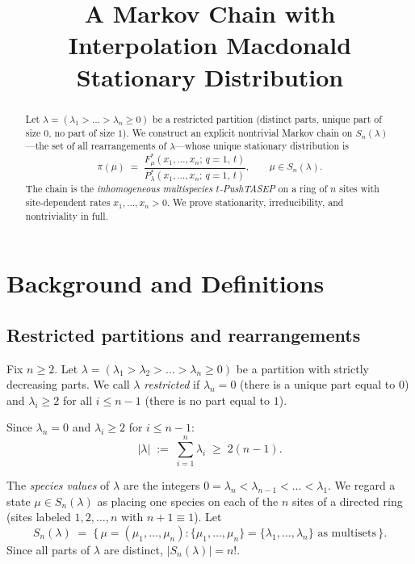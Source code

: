 \documentclass[12pt]{article}
\title{A Markov Chain with Interpolation Macdonald Stationary Distribution}
\author{}
\date{}
\theoremstyle{definition}
\begin{document}
\maketitle

\begin{abstract}
Let $\lambda = (\lambda_1 > \dots > \lambda_n \geq 0)$ be a restricted partition
(distinct parts, unique part of size $0$, no part of size $1$).  We construct
an explicit nontrivial Markov chain on $S_n(\lambda)$---the set of all
rearrangements of $\lambda$---whose unique stationary distribution is
\[
  \pi(\mu) \;=\; \frac{F^*_\mu(x_1,\dots,x_n;\,q{=}1,\,t)}{P^*_\lambda(x_1,\dots,x_n;\,q{=}1,\,t)},
  \qquad \mu \in S_n(\lambda).
\]
The chain is the \emph{inhomogeneous multispecies $t$-PushTASEP} on a ring of
$n$ sites with site-dependent rates $x_1,\dots,x_n > 0$.  We prove
stationarity, irreducibility, and nontriviality in full.
\end{abstract}

\section{Background and Definitions}

\subsection{Restricted partitions and rearrangements}

Fix $n \geq 2$.  Let $\lambda = (\lambda_1 > \lambda_2 > \dots > \lambda_n \geq 0)$
be a partition with strictly decreasing parts.  We call $\lambda$
\emph{restricted} if $\lambda_n = 0$ (there is a unique part equal to $0$) and
$\lambda_i \geq 2$ for all $i \leq n-1$ (there is no part equal to $1$).

Since $\lambda_n = 0$ and $\lambda_i \geq 2$ for $i \leq n-1$:
\begin{equation}
  |\lambda| \;:=\; \sum_{i=1}^n \lambda_i \;\geq\; 2(n-1).
\label{eq:lambda_size}
\end{equation}

The \emph{species values} of $\lambda$ are the integers
$0 = \lambda_n < \lambda_{n-1} < \dots < \lambda_1$.  We regard a state
$\mu \in S_n(\lambda)$ as placing one species on each of the $n$ sites of a
directed ring (sites labeled $1, 2, \dots, n$ with $n+1 \equiv 1$).  Let
\begin{equation}
  S_n(\lambda) \;=\;
  \{\,\mu = (\mu_1,\dots,\mu_n) :
  \{\mu_1,\dots,\mu_n\} = \{\lambda_1,\dots,\lambda_n\}\text{ as multisets}\,\}.
\label{eq:statespace}
\end{equation}
Since all parts of $\lambda$ are distinct, $|S_n(\lambda)| = n!$.
\end{document}
